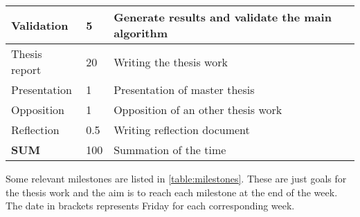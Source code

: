\begin{table}[H]
\begin{tabular}{|p{}|p{}|p{}|}
	Validation                 & 5                 & Generate results and validate the main algorithm            \\ \hline
	Thesis report              & 20                & Writing the thesis work                                     \\ \hline
	Presentation               & 1                 & Presentation of master thesis                               \\ \hline
	Opposition                 & 1                 & Opposition of an other thesis work                          \\ \hline
	Reflection                 & 0.5               & Writing reflection document                                 \\ \hline
	\textbf{SUM}               & 100                & Summation of the time                                       \\ \hline
\end{tabular}
\end{table}

Some relevant milestones are listed in \cref{table:milestones}. These are just goals for the thesis work and the aim is to reach each milestone at the end of the week. The date in brackets represents Friday for each corresponding week. 

